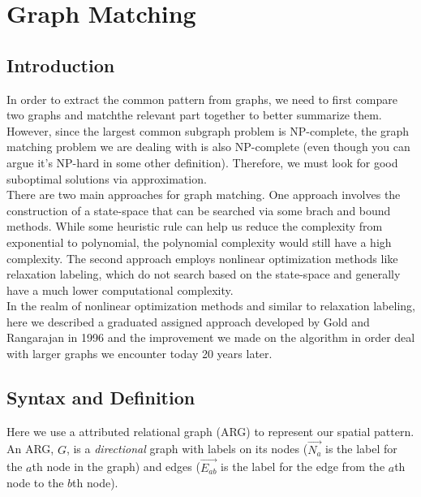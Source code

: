 \chapter{Graph Matching}

\section{Introduction}

In order to extract the common pattern from graphs, we need to first compare two graphs and match\footnotemark the relevant part together to better summarize them. However, since the largest common subgraph problem is NP-complete, the graph matching problem we are dealing with is also NP-complete (even though you can argue it's NP-hard in some other definition). Therefore, we must look for good suboptimal solutions via approximation.
\\

There are two main approaches for graph matching. One approach involves the construction of a state-space that can be searched via some brach and bound methods. While some heuristic rule can help us reduce the complexity from exponential to polynomial, the polynomial complexity would still have a high complexity. The second approach employs nonlinear optimization methods like relaxation labeling, which do not search based on the state-space and generally have a much lower computational complexity.\\

In the realm of nonlinear optimization methods and similar to relaxation labeling, here we described a graduated assigned approach developed by Gold and Rangarajan in 1996 and the improvement we made on the algorithm in order deal with larger graphs we encounter today 20 years later.

\section{Syntax and Definition}

Here we use a attributed relational graph (ARG) to represent our spatial pattern. An ARG, $G$, is a \emph{directional} graph with labels on its nodes ($\overrightarrow{N_{a}}$ is the label for the $a$th node in the graph) and edges ($\overrightarrow{E_{ab}}$ is the label for the edge from the $a$th node to the $b$th node). \\

